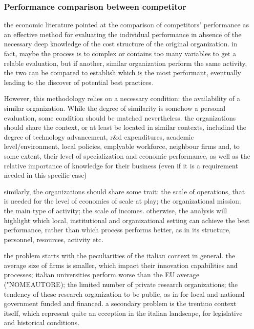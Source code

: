 \subsubsection{Performance comparison between competitor}

the economic literature pointed at the comparison of competitors' performance as an effective method for evaluating the individual performance in absence of the necessary deep knowledge of the cost structure of the original organization. in fact, maybe the process is to complex or contains too many variables to get a relable evaluation, but if another, similar organization perform the same activity, the two can be compared to establish which is the most performant, eventually leading to the discover of potential best practices.

However, this methodology relies on a necessary condition: the availability of a similar organization. While the degree of similarity is somehow a personal evaluation, some condition should be matched nevertheless. the organizations should share the context, or at least be located in similar contexts, includind the degree of technology advancement, r\&d expenditures, academic level/environment, local policies, emplyable workforce, neighbour firms and, to some extent, their level of specialization and economic performance, as well as the relative importance of knowledge for their business (even if it is a requirement needed in this specific case)

similarly, the organizations should share some trait: the scale of operations, that is needed for the level of economies of scale at play; the organizational mission; the main type of activity; the scale of incomes. otherwise, the analysis will highlight which local, institutional and organizational setting can achieve the best performance, rather than which process performs better, as in its structure, personnel, resources, activity etc.

the problem starts with the peculiarities of the italian context in general. the average size of firms is smaller, which impact their innovation capabilities and processes; italian universities perform worse than the EU average ("NOMEAUTORE); the limited number of private research organizations; the tendency of these research organization to be public, as in for local and national government funded and financed. a secondary problem is the trentino context itself, which represent quite an ecception in the italian landscape, for legislative and historical conditions. 


